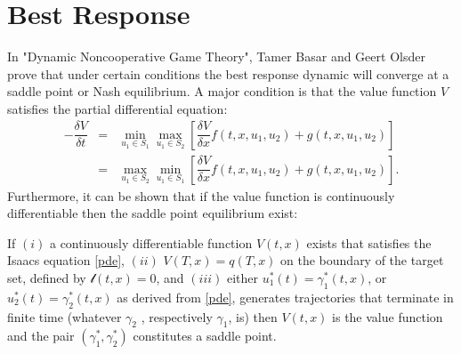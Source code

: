 \section{Best Response}
In "Dynamic Noncooperative Game Theory", Tamer Basar and Geert Olsder prove that under certain conditions the best response dynamic will converge at a saddle point or Nash equilibrium. A major condition is that the value function $V$ satisfies the partial differential equation:
\begin{eqnarray}\label{pde}
-\dfrac{\delta V}{\delta t} & = & \underset{u_1 \in S_1 }{\operatorname{min }}\underset{u_1 \in S_2 }{\operatorname{max }}[\dfrac{\delta V}{\delta x}f(t,x,u_1,u_2)+g(t,x,u_1,u_2)] \\
                            & = & \underset{u_1 \in S_2 }{\operatorname{max }}\underset{u_1 \in S_1 }{\operatorname{min }}[\dfrac{\delta V}{\delta x}f(t,x,u_1,u_2)+g(t,x,u_1,u_2)].
\end{eqnarray} 
Furthermore, it can be shown that if the value function is continuously differentiable then the saddle point equilibrium exist:
\begin{theorem}\label{pethrm}
If $(i)$ a continuously differentiable function $V(t,x)$ exists that satisfies the Isaacs equation \ref{pde}, $(ii)$ $V(T,x) = q(T,x)$ on the boundary of the target set, defined by $\mathscr{l}(t,x) = 0$, and $(iii)$ either $u_1^*(t) = \gamma_1^*(t,x)$, or $u_2^*(t) = \gamma_2^*(t,x)$ as derived from \ref{pde}, generates trajectories that terminate in finite time (whatever $\gamma_2$ , respectively $\gamma_1$, is) then $V(t,x)$ is the value function and the pair $(\gamma_1^*, \gamma_2^*)$ constitutes a saddle point.
\end{theorem}

